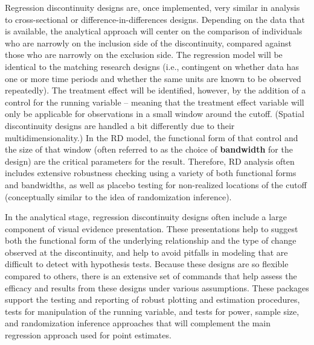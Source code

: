 Regression discontinuity designs are, once implemented,
very similar in analysis to cross-sectional or difference-in-differences designs.
Depending on the data that is available,
the analytical approach will center on the comparison of individuals
who are narrowly on the inclusion side of the discontinuity,
compared against those who are narrowly on the exclusion side.
The regression model will be identical to the matching research designs
(i.e., contingent on whether data has one or more time periods
and whether the same units are known to be observed repeatedly).
The treatment effect will be identified, however, by the addition of a control
for the running variable -- meaning that the treatment effect variable
will only be applicable for observations in a small window around the cutoff.
(Spatial discontinuity designs are handled a bit differently due to their multidimensionality.)
In the RD model, the functional form of that control and the size of that window
(often referred to as the choice of \textbf{bandwidth} for the design)
are the critical parameters for the result.\cite{calonico2019regression}
Therefore, RD analysis often includes extensive robustness checking
using a variety of both functional forms and bandwidths,
as well as placebo testing for non-realized locations of the cutoff
(conceptually similar to the idea of randomization inference).

In the analytical stage, regression discontinuity designs
often include a large component of visual evidence presentation.
These presentations help to suggest both the functional form
of the underlying relationship and the type of change observed at the discontinuity,
and help to avoid pitfalls in modeling that are difficult to detect with hypothesis tests.
Because these designs are so flexible compared to others,
there is an extensive set of commands that help assess
the efficacy and results from these designs under various assumptions.
These packages support the testing and reporting
of robust plotting and estimation procedures,
tests for manipulation of the running variable,
and tests for power, sample size, and randomization inference approaches
that will complement the main regression approach used for point estimates.

